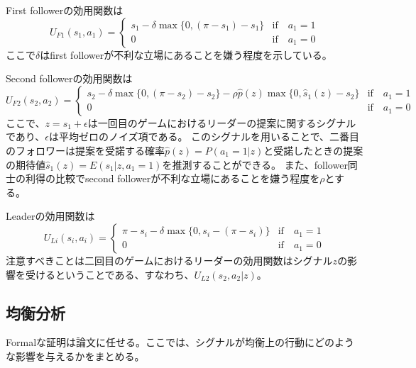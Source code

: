 \documentclass[../root]{subfiles}
\begin{document}
    First followerの効用関数は
    \begin{equation}
    U_{F1}(s_1, a_1) =
    \begin{cases}
        s_1 - \delta \max\{0,(\pi - s_1) - s_1\}   &\text{if}\quad a_1 = 1 \\
        0                                          &\text{if}\quad a_1 = 0
    \end{cases}
    \end{equation}
    ここで\(\delta\)はfirst followerが不利な立場にあることを嫌う程度を示している。

    Second followerの効用関数は
    \begin{equation}
    U_{F2}(s_2, a_2) =
    \begin{cases}
        s_2 - \delta \max\{0,(\pi - s_2) - s_2\} - \rho \hat{p}(z) \max\{0,\hat{s}_1(z) - s_2\}   &\text{if}\quad a_1 = 1 \\
        0    &\text{if}\quad a_1 = 0
    \end{cases}
    \end{equation}
    ここで、\(z = s_1 + \epsilon\)は一回目のゲームにおけるリーダーの提案に関するシグナルであり、\(\epsilon\)は平均ゼロのノイズ項である。
    このシグナルを用いることで、二番目のフォロワーは提案を受諾する確率\(\hat{p}(z) = P(a_1 = 1 | z)\)と受諾したときの提案の期待値\(\hat{s}_1(z) = E(s_1 | z, a_1 = 1)\)を推測することができる。
    また、follower同士の利得の比較でsecond followerが不利な立場にあることを嫌う程度を\(\rho\)とする。

    Leaderの効用関数は
    \begin{equation}
    U_{Li}(s_i, a_i) =
    \begin{cases}
        \pi - s_i - \delta \max\{0, s_i - (\pi - s_i)\}   &\text{if}\quad a_1 = 1 \\
        0                                                 &\text{if}\quad a_1 = 0
    \end{cases}
    \end{equation}
    注意すべきことは二回目のゲームにおけるリーダーの効用関数はシグナル\(z\)の影響を受けるということである、すなわち、\(U_{L2}(s_2, a_2 | z)\)。

    \hypertarget{ux5747ux8861ux5206ux6790}{%
    \subsection{均衡分析}\label{ux5747ux8861ux5206ux6790}}

    Formalな証明は論文に任せる。ここでは、シグナルが均衡上の行動にどのような影響を与えるかをまとめる。
\end{document}
